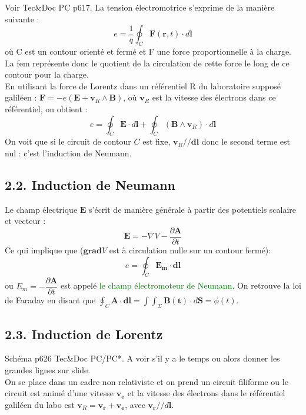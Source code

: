 \documentclass[french, a4paper, 10pt, twocolumn, landscape]{article}
\begin{document}
Voir Tec\&Doc PC p617. La tension électromotrice s'exprime de la manière suivante :
\begin{equation}
    e = \frac{1}{q} \oint_{C} \mathbf{F}(\mathbf{r}, t) \cdot d\mathbf{l}
\end{equation}
où C est un contour orienté et fermé et F une force proportionnelle à la charge. La fem représente donc le quotient de la circulation de cette force le long de ce contour pour la charge.\\ 
En utilisant la force de Lorentz dans un référentiel R du laboratoire supposé galiléen : $\mathbf F = -e(\mathbf{E}+\mathbf{v}_R\wedge \mathbf{B})$, où $\mathbf{v}_R$ est la vitesse des électrons dans ce référentiel, on obtient : 
\begin{equation}
    e = \oint_{C} \mathbf{E} \cdot d \mathbf{l} + \oint_C (\mathbf{B} \land \mathbf{v}_R) \cdot d \mathbf{l}
\end{equation}
On voit que si le circuit de contour $C$ est fixe, $\mathbf{v}_R//\mathbf{dl}$ donc le second terme est nul : c'est l'induction de Neumann.

\subsection*{2.2. Induction de Neumann}

Le champ électrique $\mathbf{E}$ s'écrit de manière générale à partir des potentiels scalaire et vecteur :
\begin{equation}
    \mathbf{E} = - \nabla V - \frac{\partial \mathbf{A}}{\partial t}
\end{equation}
Ce qui implique que ($\mathbf{grad}V$ est à circulation nulle sur un contour fermé):
\begin{equation}
    e = \oint_C \mathbf{E_m}\cdot \mathbf{dl}
\end{equation}
ou $E_m = -\dfrac{\partial \mathbf{A}}{\partial t}$ est appelé \textcolor{green}{le champ électromoteur de Neumann}. On retrouve la loi de Faraday en disant que $\oint_C \mathbf{A}\cdot\mathbf{dl}=\int\int_\Sigma \mathbf{B(t)}\cdot d\mathbf{S}=\phi(t)$.
 


\subsection*{2.3. Induction de Lorentz}

Schéma p626 Tec\&Doc PC/PC*. A voir s'il y a le temps ou alors donner les grandes lignes sur slide.\\
 On se place dans un cadre non relativiste et on prend un circuit filiforme ou le circuit est animé d'une vitesse $\mathbf{v_e}$ et la vitesse des électrons dans le référentiel galiléen du labo est $\mathbf{v}_R= \mathbf{v_r} + \mathbf{v_e}$, avec $\mathbf{v_r} // d\mathbf{l}$. \\
 
\end{document}
